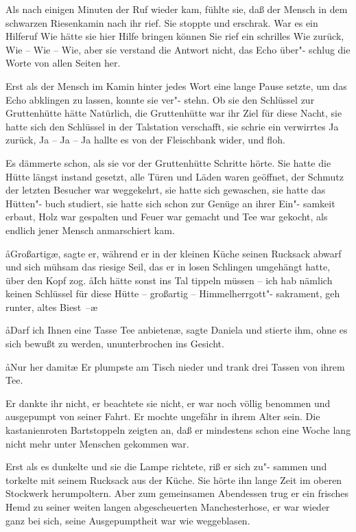 Als nach einigen Minuten der Ruf wieder kam, fühlte sie, daß
der Mensch in dem schwarzen Riesenkamin nach ihr rief. Sie
stoppte und erschrak. War es ein Hilferuf\frag{} Wie hätte sie hier
Hilfe bringen können\frag{} Sie rief ein schrilles Wie zurück, Wie --
Wie -- Wie, aber sie verstand die Antwort nicht, das Echo über"-%
schlug die Worte von allen Seiten her.

Erst als der Mensch im Kamin hinter jedes Wort eine lange
Pause setzte, um das Echo abklingen zu lassen, konnte sie ver"-%
stehn. Ob sie den Schlüssel zur Gruttenhütte hätte\frag{} Natürlich,
die Gruttenhütte war ihr Ziel für diese Nacht, sie hatte sich den
Schlüssel in der Talstation verschafft, sie schrie ein verwirrtes Ja
zurück, Ja -- Ja -- Ja hallte es von der Fleischbank wider,
und floh.

Es dämmerte schon, als sie vor der Gruttenhütte Schritte
hörte. Sie hatte die Hütte längst instand gesetzt, alle Türen
und Läden waren geöffnet, der Schmutz der letzten Besucher
war weggekehrt, sie hatte sich gewaschen, sie hatte das Hütten"-%
buch studiert, sie hatte sich schon zur Genüge an ihrer Ein"-%
samkeit erbaut, Holz war gespalten und Feuer war gemacht
und Tee war gekocht, als endlich jener Mensch anmarschiert
kam.

\aa{}Großartig\ae{}, sagte er, während er in der kleinen Küche seinen
Rucksack abwarf und sich mühsam das riesige Seil, das er in
losen Schlingen umgehängt hatte, über den Kopf zog. \aa{}Ich
hätte sonst ins Tal tippeln müssen -- ich hab nämlich keinen
Schlüssel für diese Hütte -- großartig -- Himmelherrgott"-%
sakrament, geh runter, altes Biest~--\ae{}

\aa{}Darf ich Ihnen eine Tasse Tee anbieten\ae{}, sagte Daniela und
stierte ihm, ohne es sich bewußt zu werden, ununterbrochen
ins Gesicht.

\aa{}Nur her damit\ausr{}\ae{} Er plumpste am Tisch nieder und trank drei
Tassen von ihrem Tee.

Er dankte ihr nicht, er beachtete sie nicht, er war noch völlig
benommen und ausgepumpt von seiner Fahrt. Er mochte
ungefähr in ihrem Alter sein. Die kastanienroten Bartstoppeln
zeigten an, daß er mindestens schon eine Woche lang nicht
mehr unter Menschen gekommen war.

Erst als es dunkelte und sie die Lampe richtete, riß er sich zu"-%
sammen und torkelte mit seinem Rucksack aus der Küche. Sie
hörte ihn lange Zeit im oberen Stockwerk herumpoltern.
Aber zum gemeinsamen Abendessen trug er ein frisches Hemd
zu seiner weiten langen abgescheuerten Manchesterhose, er
war wieder ganz bei sich, seine Ausgepumptheit war wie
weggeblasen.

